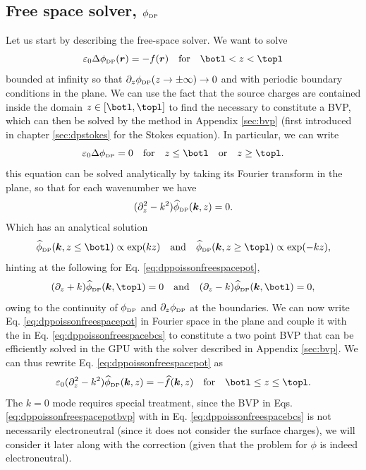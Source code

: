 \documentclass[twoside,openright,titlepage,numbers=noenddot,%
headinclude,footinclude,cleardoublepage=empty,abstract=on,
BCOR=5mm,fontsize=11pt, dvipsnames, paper=b5
]{scrreprt}
\renewcommand{\vec}[1]{\bm{#1}}
\newcommand{\gpu}{\gls{GPU}\xspace}
\newcommand{\fou}[1]{\widehat{#1}}
\newcommand{\fpos}{r}
\newcommand{\dpr}{\text{\tiny DP}}
\begin{document}
\subsection{Free space solver, $\phi_{\dpr}$}\label{sec:dpsolver}
Let us start by describing the free-space solver. We want to solve
\begin{equation}
  \label{eq:dppoissonfreespacepot}
  \varepsilon_0 \Delta \phi_{\dpr}(\vec{\fpos}) = -f(\vec{\fpos}) \quad \text{for}\quad \botl<z<\topl
\end{equation}
bounded at infinity so that $\partial_z\phi_{\dpr}(z \rightarrow \pm \infty) \rightarrow 0$ and with periodic boundary conditions in the plane.
We can use the fact that the source charges are contained inside the domain $z\in[\botl, \topl]$ to find the necessary \bcs to constitute a \gls{BVP}, which can then be solved by the method in Appendix \ref{sec:bvp} (first introduced in chapter \ref{sec:dpstokes} for the Stokes equation). In particular, we can write
\begin{equation}
  \varepsilon_0 \Delta \phi_{\dpr} = 0\quad\text{for}\quad z\le\botl \quad\text{or}\quad z\ge \topl.
\end{equation}
this equation can be solved analytically by taking its Fourier transform in the plane, so that for each wavenumber we have
\begin{equation}
  (\partial_z^2 - k^2)\fou{\phi}_{\dpr}(\vec{k}, z) = 0.
\end{equation}
Which has an analytical solution
\begin{equation}
  \fou{\phi}_{\dpr}(\vec{k}, z \le \botl) \propto \exp(kz)\quad\text{and}\quad\fou{\phi}_{\dpr}(\vec{k}, z \ge \topl) \propto \exp(-kz),
\end{equation}
hinting at the following \bcs for Eq. \eqref{eq:dppoissonfreespacepot},
\begin{equation}
  \label{eq:dppoissonfreespacebcs}
  (\partial_z + k)\fou{\phi}_{\dpr}(\vec{k}, \topl) = 0\quad\text{and}\quad(\partial_z - k)\fou{\phi}_{\dpr}(\vec{k}, \botl) = 0, 
\end{equation}
owing to the continuity of $\phi_{\dpr}$ and $\partial_z\phi_{\dpr}$ at the boundaries.
We can now write Eq. \eqref{eq:dppoissonfreespacepot} in Fourier space in the plane and couple it with the \bcs in Eq. \eqref{eq:dppoissonfreespacebcs} to constitute a two point \gls{BVP} that can be efficiently solved in the \gpu with the solver described in Appendix \ref{sec:bvp}. We can thus rewrite Eq. \eqref{eq:dppoissonfreespacepot} as
\begin{equation}
  \label{eq:dppoissonfreespacepotbvp}
  \varepsilon_0(\partial_z^2 - k^2)\fou{\phi}_{\dpr}(\vec{k}, z) = -\fou{f}(\vec{k}, z) \quad \text{for}\quad \botl\le z\le \topl.
\end{equation}
The $k=0$ mode requires special treatment, since the \gls{BVP} in Eqs. \eqref{eq:dppoissonfreespacepotbvp} with \bcs in Eq. \eqref{eq:dppoissonfreespacebcs} is not necessarily electroneutral (since it does not consider the surface charges), we will consider it later along with the correction (given that the problem for $\phi$ is indeed electroneutral).
\end{document}
